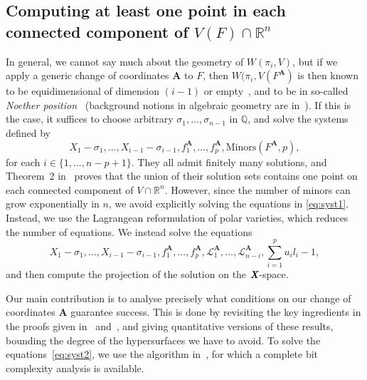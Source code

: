 \documentclass[a4paper]{article}
\def\Xb{\textit{\textbf{X}}}
\def\mA{{\bm A}}
\def\minorsA{\textrm{Minors}(F^{\mA},p)}
\def\Q{\mathbb{Q}}
\def\R{\mathbb{R}}
\def\Wi{W(\pi_i,V)}
\def\WiA{W(\pi_i,V(F^{\mA})}
\def\udl{\sum_{i=1}^pu_il_i}
\begin{document}
\subsection{Computing at least one point in each connected component of $V(F) \cap \R^n$} 
%
In general, we cannot say much about the geometry of $\Wi$, but if we apply a generic change of coordinates $\mA$ to $F$, then $\WiA$ is then known to be equidimensional of dimension $(i-1)$ or
empty~\cite{BaGiHeMb97}, and to be in so-called {\em Noether
  position}~\cite{EMP} (background notions in algebraic geometry are
in~\cite{Mumford76,Shafarevich77,ECA}). If this is the case, it suffices to choose arbitrary
$\sigma_1,\dots,\sigma_{n-1}$ in $\Q$, and solve the systems defined
by
%
\begin{equation}\label{eq:syst1}
X_1-\sigma_1,\dots,X_{i-1}-\sigma_{i-1}, f_1^{\mA},\hdots,f_p^{\mA},  \minorsA,  
\end{equation}
%
for each $i\in \{1,\dots,n-p+1\}$.  They all admit finitely many solutions, and
Theorem~2 in~\cite{EMP} proves that the union of their solution sets
contains one point on each connected component of $V \cap \R^n$. However, since the number of minors can grow exponentially in $n$, we avoid explicitly solving the equations in \eqref{eq:syst1}. Instead, we use the Lagrangean reformulation of  polar varieties, which reduces the number of equations. We instead solve the equations
%
\begin{equation}\label{eq:syst2}
X_1-\sigma_1,\dots,X_{i-1}-\sigma_{i-1}, f_1^{\mA},\hdots,f_p^{\mA}, \mathscr{L}_1^{\mA}, \hdots, \mathscr{L}_{n-i}^{\mA},\udl-1,
\end{equation}
%
and then compute the projection of the solution on the $\Xb$-space.

Our main contribution is to analyse precisely what conditions on our
change of coordinates $\mA$ guarantee success. This is done by
revisiting the key ingredients in the proofs given
in~\cite{BaGiHeMb97} and~\cite{EMP}, and giving quantitative versions
of these results, bounding the degree of the hypersurfaces we have to
avoid.  To solve the equations~\eqref{eq:syst2}, we use the algorithm
in~\cite{SH}, for which a complete bit complexity analysis is
available.


\end{document}
